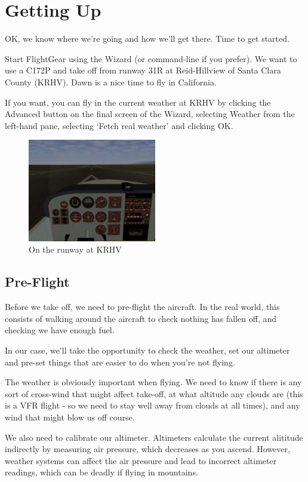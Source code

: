 \section{Getting Up}

OK, we know where we're going and how we'll get there. Time to get started.

Start FlightGear using the Wizard (or command-line if you prefer).
 We want to use a C172P and take off from runway 31R at Reid-Hillview of
 Santa Clara County (KRHV). Dawn is a nice time to fly in California.

If you want, you can fly in the current weather at KRHV by clicking the
Advanced button on the final screen of the Wizard, selecting Weather
from the left-hand pane, selecting `Fetch real weather' and clicking OK.

\begin{figure}[!htp]
\centering
\includegraphics[width=0.5\textwidth]{krhvrunway}
\caption{On the runway at KRHV}
\end{figure}

\subsection{Pre-Flight}

Before we take off, we need to pre-flight the aircraft. In the real world,
this consists of walking around the aircraft to check nothing has fallen
off, and checking we have enough fuel.

In our case, we'll take the opportunity to check the weather, set our
altimeter and pre-set things that are easier to do when you're not flying.

The weather is obviously important when flying. We need to know if
there is any sort of cross-wind that might affect take-off, at what
altitude any clouds are (this is a VFR flight - so we need to stay
well away from clouds at all times), and any wind that might blow us off course.

We also need to calibrate our altimeter. Altimeters calculate the
current alititude indirectly by measuring air pressure, which decreases
as you ascend. However, weather systems can affect the air pressure and
lead to incorrect altimeter readings, which can be deadly if flying in mountains.

